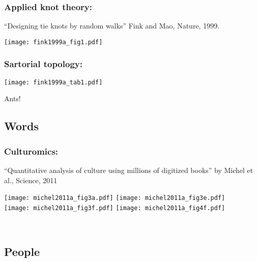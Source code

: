 \begin{frame}
  \frametitle{Applied knot theory:}

  ``Designing tie knots by random walks''\cite{fink1999a}
  Fink and Mao, Nature, 1999.

  \texttt{[image: fink1999a\_fig1.pdf]}

\end{frame}

\begin{frame}
  \frametitle{Sartorial topology:}
  
  \texttt{[image: fink1999a\_tab1.pdf]}

\end{frame}

\begin{frame}

  Ants!
\end{frame}


\subsection{Words}

\begin{frame}
  \frametitle{Culturomics:}

  \small{``Quantitative analysis of culture using millions of
    digitized books'' by Michel et al., Science, 2011\cite{michel2011a}}

  \texttt{[image: michel2011a\_fig3a.pdf]} 
  \texttt{[image: michel2011a\_fig3e.pdf]} \\
  \texttt{[image: michel2011a\_fig3f.pdf]}
  \texttt{[image: michel2011a\_fig4f.pdf]}

  {\small
    \\
  }

\end{frame}

\subsection{People}

